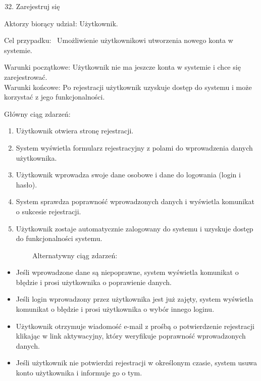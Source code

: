 \documentclass[
]{article}
\providecommand{\tightlist}{%
  \setlength{\itemsep}{0pt}\setlength{\parskip}{0pt}}
\begin{document}
\begin{enumerate}
\setcounter{enumi}{31}
\tightlist
\item
  {Zarejestruj się}
\end{enumerate}

{Aktorzy biorący udział: Użytkownik.}

{Cel przypadku: ~Umożliwienie użytkownikowi utworzenia nowego konta w
systemie.}

{Warunki początkowe: Użytkownik nie ma jeszcze konta w systemie i chce
się zarejestrować.\\
Warunki końcowe: Po rejestracji użytkownik uzyskuje dostęp do systemu i
może korzystać z jego funkcjonalności.}

{Główny ciąg zdarzeń:}

\begin{enumerate}
\tightlist
\item
  {Użytkownik otwiera stronę rejestracji.}
\item
  {System wyświetla formularz rejestracyjny z polami do wprowadzenia
  danych użytkownika.}
\item
  {Użytkownik wprowadza swoje dane osobowe i dane do logowania (login i
  hasło).}
\item
  {System sprawdza poprawność wprowadzonych danych i wyświetla komunikat
  o sukcesie rejestracji.}
\item
  {Użytkownik zostaje automatycznie zalogowany do systemu i uzyskuje
  dostęp do funkcjonalności systemu.}
\end{enumerate}

{~~~~~~~~Alternatywny ciąg zdarzeń:}

\begin{itemize}
\tightlist
\item
  {Jeśli wprowadzone dane są niepoprawne, system wyświetla komunikat o
  błędzie i prosi użytkownika o poprawienie danych.}
\item
  {Jeśli login wprowadzony przez użytkownika jest już zajęty, system
  wyświetla komunikat o błędzie i prosi użytkownika o wybór innego
  loginu.}
\item
  {Użytkownik otrzymuje wiadomość e-mail z prośbą o potwierdzenie
  rejestracji klikając w link aktywacyjny, który weryfikuje poprawność
  wprowadzonych danych.}
\item
  {Jeśli użytkownik nie potwierdzi rejestracji w określonym czasie,
  system usuwa konto użytkownika i informuje go o tym.\\
  }
\end{itemize}
\end{document}
